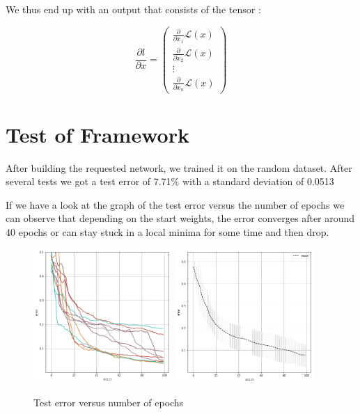 \documentclass{article}
\begin{document}
We thus end up with an output that consists of the tensor :


\[\frac{\partial l}{\partial x} = \begin{pmatrix}
									\frac{\partial}{\partial x_1}\mathcal{L}(x) \\
									\frac{\partial}{\partial x_2}\mathcal{L}(x) \\
									\vdots \\
									\frac{\partial}{\partial x_n}\mathcal{L}(x) 
								  \end{pmatrix} \]
								  

\section{Test of Framework}

After building the requested network, we trained it on the random dataset. After several tests we got a test error of 7.71\% with a standard deviation of 0.0513

If we have a look at the graph of the test error versus the number of epochs we can observe that depending on the start weights, the error converges after around 40 epochs or can stay stuck in a local minima for some time and then drop.  

\begin{figure}[H]
\begin{center}
\includegraphics[width=0.47\textwidth]{err_mse_sep}
\includegraphics[width=0.47\textwidth]{err_mse}
\caption{Test error versus number of epochs}
\end{center}
\end{figure}
\end{document}
